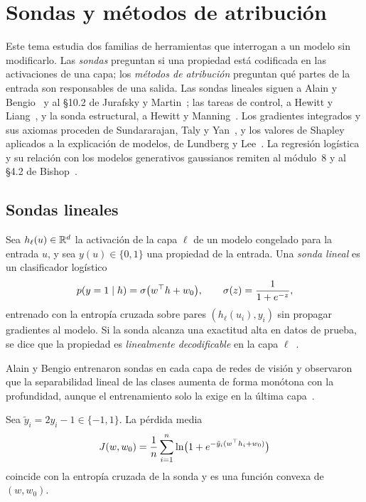 \chapter{Sondas y métodos de atribución}
\label{tema:2}

Este tema estudia dos familias de herramientas que interrogan a un modelo sin modificarlo. Las \emph{sondas} preguntan si una propiedad está codificada en las activaciones de una capa; los \emph{métodos de atribución} preguntan qué partes de la entrada son responsables de una salida. Las sondas lineales siguen a Alain y Bengio~\cite{alain} y al §10.2 de Jurafsky y Martin~\cite{jm3}; las tareas de control, a Hewitt y Liang~\cite{hewitt-liang}, y la sonda estructural, a Hewitt y Manning~\cite{hewitt-manning}. Los gradientes integrados y sus axiomas proceden de Sundararajan, Taly y Yan~\cite{sundararajan}, y los valores de Shapley aplicados a la explicación de modelos, de Lundberg y Lee~\cite{lundberg}. La regresión logística y su relación con los modelos generativos gaussianos remiten al módulo~8 y al §4.2 de Bishop~\cite{bishop}.

\section{Sondas lineales}

\begin{definicion}\label{def:sonda}
Sea $h_\ell(u)\in\mathbb{R}^{d}$ la activación de la capa $\ell$ de un modelo congelado para la entrada $u$, y sea $y(u)\in\{0,1\}$ una propiedad de la entrada. Una \emph{sonda lineal} es un clasificador logístico
\[
p(y=1\mid h)=\sigma\bigl(w^{\top} h+w_0\bigr),\qquad \sigma(z)=\frac{1}{1+e^{-z}},
\]
entrenado con la entropía cruzada sobre pares $(h_\ell(u_i),y_i)$ sin propagar gradientes al modelo. Si la sonda alcanza una exactitud alta en datos de prueba, se dice que la propiedad es \emph{linealmente decodificable} en la capa $\ell$~\cite{alain}.
\end{definicion}

Alain y Bengio entrenaron sondas en cada capa de redes de visión y observaron que la separabilidad lineal de las clases aumenta de forma monótona con la profundidad, aunque el entrenamiento solo la exige en la última capa~\cite{alain}.

\begin{proposicion}\label{prop:sonda-convexa}
Sea $\tilde y_i=2y_i-1\in\{-1,1\}$. La pérdida media
\[
J(w,w_0)=\frac1n\sum_{i=1}^{n}\ln\bigl(1+e^{-\tilde y_i(w^{\top} h_i+w_0)}\bigr)
\]
coincide con la entropía cruzada de la sonda y es una función convexa de $(w,w_0)$.
\end{proposicion}

